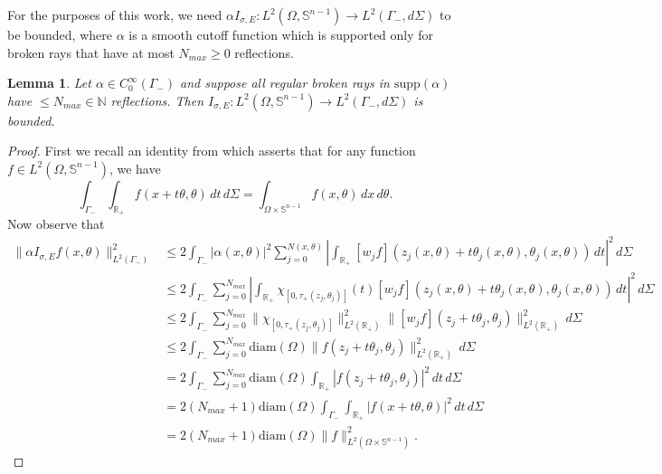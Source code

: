 \documentclass[10pt]{amsart}
\newtheorem{lemma}{Lemma}
\theoremstyle{definition}
\theoremstyle{definition}
\theoremstyle{definition}
\begin{document}
For the purposes of this work, we need $\alpha I_{\sigma, E}: L^{2}(\Omega, \mathbb{S}^{n-1}) \to L^{2}(\Gamma_{-}, d\Sigma)$ to be bounded, where $\alpha$ is a smooth cutoff function which is supported only for broken rays that have at most $N_{max} \geq 0$ reflections. 
\begin{lemma}Let $\alpha \in C_{0}^{\infty}(\Gamma_{-})$ and suppose all regular broken rays in $\mathrm{supp}(\alpha)$ have $\leq N_{max} \in \mathbb{N}$ reflections. Then $I_{\sigma, E}:L^{2}(\Omega, \mathbb{S}^{n-1}) \to L^{2}(\Gamma_{-}, d\Sigma)$ is bounded.\end{lemma}
\begin{proof}
First we recall an identity from \cite{inversesource} which asserts that for any function $f \in L^{2}(\Omega, \mathbb{S}^{n-1})$, we have
\begin{equation*}
\int_{\Gamma_{-}}\int_{\mathbb{R}_{+}} f(x+t\theta, \theta)\,dt\,d\Sigma = \int_{\Omega \times \mathbb{S}^{n-1}} f(x,\theta)\,dx\,d\theta.
\end{equation*}
Now observe that
\begin{align*}
\| \alpha I_{\sigma, E} f(x,\theta) \|_{L^{2}(\Gamma_{-})}^{2} & \leq 2 \int_{\Gamma_{-}} |\alpha(x,\theta)|^{2}\sum_{j=0}^{N(x,\theta)}\left| \int_{\mathbb{R}_{+}} [w_{j} f](z_{j}(x,\theta) + t\theta_{j}(x,\theta), \theta_{j}(x,\theta))\,dt \right|^{2} \, d\Sigma\\
&\leq 2 \int_{\Gamma_{-}} \sum_{j=0}^{N_{max}}\left| \int_{\mathbb{R}_{+}} \chi_{[0,\tau_{+}(z_{j},\theta_{j})]}(t)[w_{j} f](z_{j}(x,\theta) + t\theta_{j}(x,\theta), \theta_{j}(x,\theta))\,dt \right|^{2} \, d\Sigma\\
& \leq 2 \int_{\Gamma_{-}} \sum_{j=0}^{N_{max}} \|\chi_{[0,\tau_{+}(z_{j},\theta_{j})]}\|_{L^{2}(\mathbb{R}_{+})}^{2}\|[w_{j}f](z_{j}+t\theta_{j},\theta_{j})\|_{L^{2}(\mathbb{R}_{+})}^{2}\,d\Sigma\\
& \leq 2 \int_{\Gamma_{-}} \sum_{j=0}^{N_{max}} \mathrm{diam}(\Omega)\|f(z_{j}+t\theta_{j},\theta_{j})\|_{L^{2}(\mathbb{R}_{+})}^{2}\,d\Sigma\\
& = 2 \int_{\Gamma_{-}} \sum_{j=0}^{N_{max}} \mathrm{diam}(\Omega)\int_{\mathbb{R}_{+}}|f(z_{j}+t\theta_{j},\theta_{j})|^{2}\,dt\,d\Sigma\\
& = 2 (N_{max}+1)\mathrm{diam}(\Omega)\int_{\Gamma_{-}} \int_{\mathbb{R}_{+}}|f(x+t\theta,\theta)|^{2}\,dt\,d\Sigma\\
& = 2 (N_{max}+1)\mathrm{diam}(\Omega)\|f\|_{L^{2}(\Omega \times \mathbb{S}^{n-1})}^{2}.
\end{align*}
\end{proof}
\end{document}

